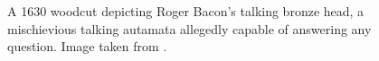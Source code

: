 \begin{figure}
    \centering
    \noindent
    {%
        \setlength{\fboxsep}{0pt}%
        \setlength{\fboxrule}{1pt}%
    }

\caption{A 1630 woodcut depicting Roger Bacon's talking bronze head, a
mischievious talking autamata allegedly capable of answering any question.
Image taken from \cite{hyman2016automaton}.}
\label{fig:brazen_head}

\end{figure}
 
